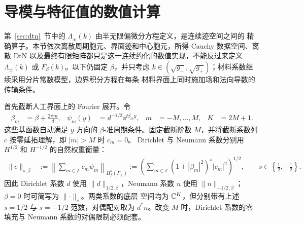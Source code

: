 \section{导模与特征值的数值计算}
\label{sec:numerics}

第~\ref{sec:dtn}~节中的 $\Lambda_\pm(k)$ 由半无限偏微分方程定义，是连续迹空间之间的
精确算子。本节依次离散周期胞元、界面迹和中心胞元，所得 Cauchy 数据空间、离散 DtN
以及最终有限矩阵都只是这一连续约化的数值实现，不能反过来定义 $\Lambda_\pm(k)$ 或
$F_\beta(k)$。以下仍固定 $\beta$，并只考虑
$k\in(\sqrt{g_-},\sqrt{g_+})$；材料系数继续采用分片常数模型，边界积分方程在每条
材料界面上同时施加场和法向导数的传输条件。

首先截断人工界面上的 Fourier 展开。令
\begin{align}
  \beta_m&=\beta+\frac{2\pi m}{d},
  &\psi_m(y)&=d^{-1/2}\ee^{\ii\beta_m y},
  &m&=-M,\ldots,M,
  &K&=2M+1.
  \label{eq:port-fourier-basis}
\end{align}
这些基函数自动满足 $y$ 方向的 $\beta$-准周期条件。固定截断阶数 $M$，并将截断系数列
$c$ 按零延拓理解，即 $|m|>M$ 时 $c_m=0$。
Dirichlet 与 Neumann 系数分别用 $H^{1/2}$ 和 $H^{-1/2}$ 的自然权重衡量：
\begin{align}
  \lVert c\rVert_{s,\beta}
  &:=\left\lVert
    \sum_{m\in\mathbb Z}c_m\psi_m
  \right\rVert_{H^s_\beta(\Gamma_\pm)}
  :=\left(
    \sum_{m\in\mathbb Z}
    (1+|\beta_m|^2)^s|c_m|^2
  \right)^{1/2},
  \qquad s\in\left\{\frac12,-\frac12\right\}.
  \label{eq:port-fourier-norms}
\end{align}
因此 Dirichlet 系数 $d$ 使用 $\lVert d\rVert_{1/2,\beta}$，Neumann 系数 $n$
使用 $\lVert n\rVert_{-1/2,\beta}$；$\beta=0$ 时可简写为 $\lVert\cdot\rVert_s$。两类系数的底层
空间均为 $\mathbb{C}^K$，但分别带有上述 $s=1/2$ 与 $s=-1/2$ 范数，对偶配对取为
$d^*n$。改变 $M$ 时，Dirichlet 系数的零填充与 Neumann 系数的对偶限制必须配套。

